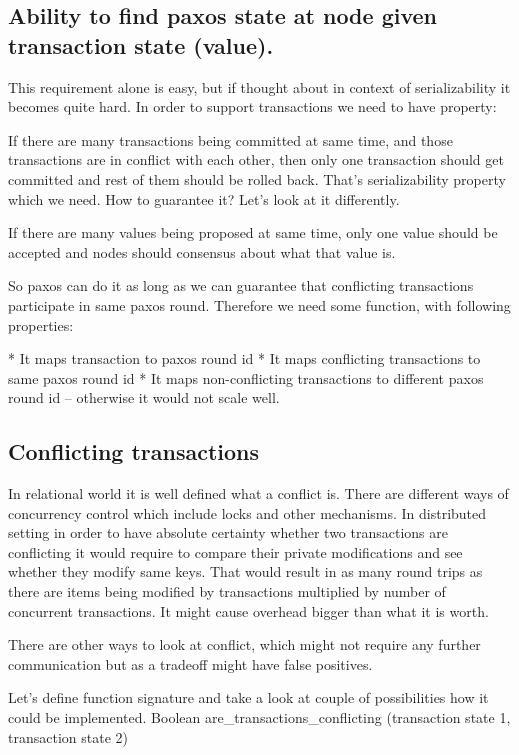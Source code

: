 \subsection{Ability to find paxos state at node given transaction state (value).}
This requirement alone is easy, but if thought about in context of serializability it becomes quite hard. In order to support transactions we need to have property:


If there are many transactions being committed at same time, and those transactions are in conflict with each other, then only one transaction should get committed and rest of them should be rolled back. 
That’s serializability property which we need. How to guarantee it? Let’s look at it differently.


If there are many values being proposed at same time, only one value should be accepted and nodes should consensus about what that value is.


So paxos can do it as long as we can guarantee that conflicting transactions participate in same paxos round. Therefore we need some function, with following properties:


* It maps transaction to paxos round id
* It maps conflicting transactions to same paxos round id 
* It maps non-conflicting transactions to different paxos round id -- otherwise it would not scale well.


\subsection{Conflicting transactions}
In relational world it is well defined what a conflict is. There are different ways of concurrency control which include locks and other mechanisms. In distributed setting in order to have absolute certainty whether two transactions are conflicting it would require to compare their private modifications and see whether they modify same keys. That would result in as many round trips as there are items being modified by transactions multiplied by number of concurrent transactions. It might cause overhead bigger than what it is worth. 


There are other ways to look at conflict, which might not require any further communication but as a tradeoff might have false positives. 


Let’s define function signature and take a look at couple of possibilities how it could be implemented.
Boolean are_transactions_conflicting (transaction state 1, transaction state 2)


